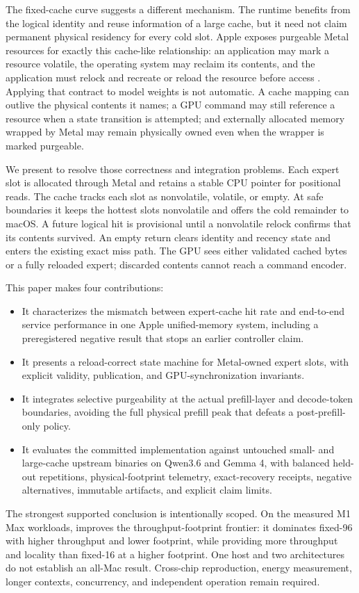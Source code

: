 The fixed-cache curve suggests a different mechanism. The runtime benefits from
the logical identity and reuse information of a large cache, but it need not
claim permanent physical residency for every cold slot. Apple exposes
purgeable Metal resources for exactly this cache-like relationship: an
application may mark a resource volatile, the operating system may reclaim its
contents, and the application must relock and recreate or reload the resource
before access \cite{apple2026purgeable,apple2026metalfootprint}. Applying that
contract to model weights is not automatic. A cache mapping can outlive the
physical contents it names; a GPU command may still reference a resource when a
state transition is attempted; and externally allocated memory wrapped by
Metal may remain physically owned even when the wrapper is marked purgeable.

We present \system to resolve those correctness and integration problems. Each
expert slot is allocated through Metal and retains a stable CPU pointer for
positional reads. The cache tracks each slot as nonvolatile, volatile, or
empty. At safe boundaries it
keeps the hottest slots nonvolatile and offers the cold remainder to macOS. A
future logical hit is provisional until a nonvolatile relock confirms that its
contents survived. An empty return clears identity and recency state and enters
the existing exact miss path. The GPU sees either validated cached bytes or a
fully reloaded expert; discarded contents cannot reach a command encoder.

This paper makes four contributions:

\begin{itemize}
  \item It characterizes the mismatch between expert-cache hit rate and
  end-to-end service performance in one Apple unified-memory system, including
  a preregistered negative result that stops an earlier controller claim.
  \item It presents a reload-correct state machine for Metal-owned expert slots,
  with explicit validity, publication, and GPU-synchronization invariants.
  \item It integrates selective purgeability at the actual prefill-layer and
  decode-token boundaries, avoiding the full physical prefill peak that defeats
  a post-prefill-only policy.
  \item It evaluates the committed implementation against untouched small- and
  large-cache upstream binaries on Qwen3.6 and Gemma 4, with balanced held-out
  repetitions, physical-footprint telemetry, exact-recovery receipts, negative
  alternatives, immutable artifacts, and explicit claim limits.
\end{itemize}

The strongest supported conclusion is intentionally scoped. On the measured M1
Max workloads, \system improves the throughput-footprint frontier: it dominates
fixed-96 with higher throughput and lower footprint, while providing more
throughput and locality than fixed-16 at a higher footprint. One host and two
architectures do not establish an all-Mac result. Cross-chip reproduction,
energy measurement, longer contexts, concurrency, and independent operation
remain required.
